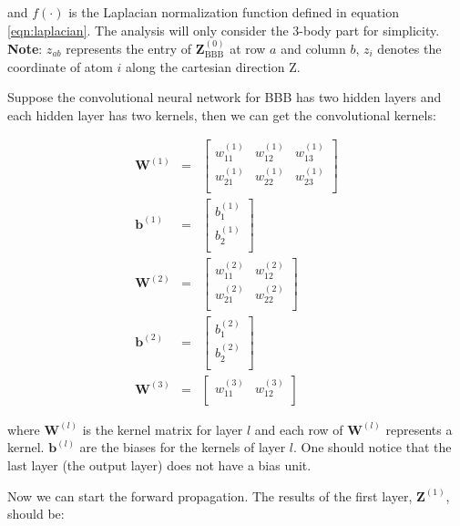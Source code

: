 \noindent and $f(\cdot)$ is the Laplacian normalization function defined in equation 
\ref{eqn:laplacian}. The analysis will only consider the 3-body part for simplicity. 
\textbf{Note}: $z_{ab}$ represents the entry of $\mathbf{Z}^{(0)}_{\mathrm{BBB}}$ at row $a$ 
and column $b$, $z_{i}$ denotes the coordinate of atom $i$ along the cartesian direction Z. 

Suppose the convolutional neural network for BBB has two hidden layers and each hidden 
layer has two kernels, then we can get the convolutional kernels:

\begin{eqnarray}
\mathbf{W}^{(1)} & = & \left[\begin{array}{ccc}
	w^{(1)}_{11} & w^{(1)}_{12} & w^{(1)}_{13} \\
	w^{(1)}_{21} & w^{(1)}_{22} & w^{(1)}_{23} \\
\end{array}
\right] \\
\mathbf{b}^{(1)} & = & \left[\begin{array}{c}
	b^{(1)}_{1} \\
	b^{(1)}_{2} \\
\end{array}
\right] \\
\mathbf{W}^{(2)} & = & \left[\begin{array}{cc}
	w^{(2)}_{11} & w^{(2)}_{12} \\
	w^{(2)}_{21} & w^{(2)}_{22} \\
\end{array}
\right] \\
\mathbf{b}^{(2)} & = & \left[\begin{array}{c}
	b^{(2)}_{1} \\
	b^{(2)}_{2} \\
\end{array}
\right] \\
\mathbf{W}^{(3)} & = & \left[\begin{array}{cc}
	w^{(3)}_{11} & w^{(3)}_{12} \\
\end{array}
\right]
\end{eqnarray}

\noindent where $\mathbf{W}^{(l)}$ is the kernel matrix for layer $l$ and each row of  
$\mathbf{W}^{(l)}$ represents a kernel. $\mathbf{b}^{(l)}$ are the biases for the kernels of 
layer $l$. One should notice that the last layer (the output layer) does not have a bias unit.

\noindent Now we can start the forward propagation. The results of the first layer,
$\mathbf{Z}^{(1)}$, should be:

